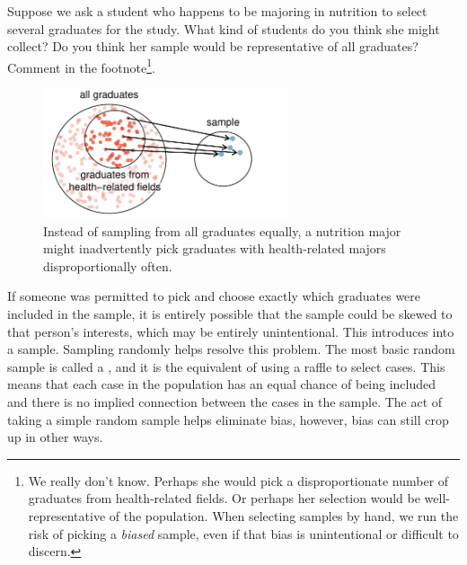 \begin{exercise}
Suppose we ask a student who happens to be majoring in nutrition to select several graduates for the study. What kind of students do you think she might collect? Do you think her sample would be representative of all graduates? Comment in the footnote\footnote{We really don't know. Perhaps she would pick a disproportionate number of graduates from health-related fields. Or perhaps her selection would be well-representative of the population. When selecting samples by hand, we run the risk of picking a \emph{biased} sample, even if that bias is unintentional or difficult to discern.}.
\end{exercise}
\begin{figure}
\centering
\includegraphics[height=1.5in]{01/figures/popToSample/popToSubSampleGraduates}
\caption{Instead of sampling from all graduates equally, a nutrition major might inadvertently pick graduates with health-related majors disproportionally often.}
\label{popToSubSampleGraduates}
\end{figure}

If someone was permitted to pick and choose exactly which graduates were included in the sample, it is entirely possible that the sample could be skewed to that person's interests, which may be entirely unintentional. This introduces  into a sample. Sampling randomly helps resolve this problem. The most basic random sample is called a , and it is the equivalent of using a raffle to select cases. This means that each case in the population has an equal chance of being included and there is no implied connection between the cases in the sample. The act of taking a simple random sample helps eliminate bias, however, bias can still crop up in other ways.

